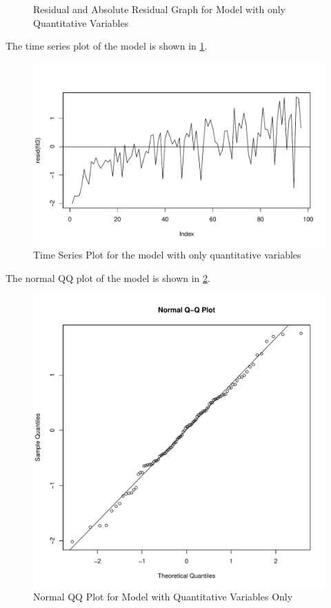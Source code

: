 \documentclass[12pt,letterpaper,titlepage,en-US]{article}
\begin{document}
\begin{figure}[H]
\begin{subfigure}[t]{0.5\textwidth}
    \end{subfigure}
    \caption{Residual and Absolute Residual Graph for Model with only Quantitative Variables}
\end{figure}

The time series plot of the model is shown in \cref{timefit3}.
\begin{figure}[H]
    \centering
    \caption{Time Series Plot for the model with only quantitative variables}\label{timefit3}
    \includegraphics[width=.9\textwidth]{fig/plotfit3times.pdf}
\end{figure}

The normal QQ plot of the model is shown in \cref{qqfit3}.

\begin{figure}[H]
    \centering
    \caption{Normal QQ Plot for Model with Quantitative Variables Only}\label{qqfit3}
    \includegraphics[width=.85\textwidth]{fig/qqnormplotfit3.pdf}
\end{figure}
\end{document}
